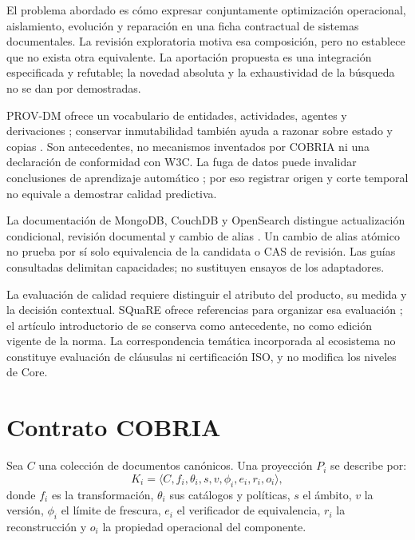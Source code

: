 \documentclass[12pt]{article}
\begin{document}
El problema abordado es cómo expresar conjuntamente optimización operacional,
aislamiento, evolución y reparación en una ficha contractual de sistemas documentales.
La revisión exploratoria motiva esa composición, pero no establece que no exista otra
equivalente. La aportación propuesta es una integración especificada y refutable;
la novedad absoluta y la exhaustividad de la búsqueda no se dan por demostradas.

\COBRIAMetodoLiteratura

\COBRIAAlcanceEPocho

PROV-DM ofrece un vocabulario de entidades, actividades, agentes y derivaciones
\parencite{w3c2013prov}; conservar inmutabilidad también ayuda a razonar sobre
estado y copias \parencite{helland2015immutability}. Son antecedentes, no mecanismos
inventados por COBRIA ni una declaración de conformidad con W3C. La fuga de datos
puede invalidar conclusiones de aprendizaje automático \parencite{kapoor2023leakage};
por eso registrar origen y corte temporal no equivale a demostrar calidad predictiva.

La documentación de MongoDB, CouchDB y OpenSearch distingue actualización
condicional, revisión documental y cambio de alias
\parencite{mongodbAtomicity,apacheCouchDocumentApi,opensearch32Alias}. Un cambio de
alias atómico no prueba por sí solo equivalencia de la candidata o CAS de revisión.
Las guías consultadas delimitan capacidades; no sustituyen ensayos de los adaptadores.



La evaluación de calidad requiere distinguir el atributo del producto, su medida y
la decisión contextual. SQuaRE ofrece referencias para organizar esa evaluación
\parencite{iso25010_2023,iso25040_2024}; el artículo introductorio de
\textcite{roa2015iso25000} se conserva como antecedente, no como edición vigente
de la norma. La correspondencia temática incorporada al ecosistema no constituye
evaluación de cláusulas ni certificación ISO, y no modifica los niveles de Core.

\section{Contrato COBRIA}

Sea $C$ una colección de documentos canónicos. Una proyección $P_i$ se describe por:
\[
K_i=\langle C,f_i,\theta_i,s,v,\phi_i,e_i,r_i,o_i\rangle,
\]
donde $f_i$ es la transformación, $\theta_i$ sus catálogos y políticas, $s$ el ámbito,
$v$ la versión, $\phi_i$ el límite de frescura, $e_i$ el verificador de equivalencia,
$r_i$ la reconstrucción y $o_i$ la propiedad operacional del componente.
\end{document}
